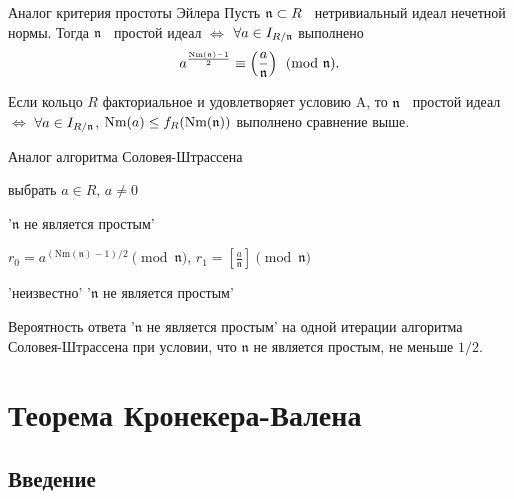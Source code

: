 \documentclass[8pt, xcolor=x11names]{beamer}
\begin{document}
\begin{frame}
    \begin{block}{Аналог критерия простоты Эйлера}
        Пусть $\mathfrak{n} \subset R$ \textendash\ нетривиальный идеал нечетной нормы.
        Тогда $\mathfrak{n}$ \textendash\ простой идеал $\Leftrightarrow$ $\forall a \in I_{R/\mathfrak{n}}$ выполнено
        \begin{equation*}\label{eq:euler}
            a^{\frac{\textrm{Nm}(\mathfrak{n}) - 1}{2}} \equiv \left(\frac{a}{\mathfrak{n}}\right) \pmod{\mathfrak{n}}.
        \end{equation*}
    
        Если кольцо $R$ факториальное и удовлетворяет условию A, то $\mathfrak{n}$ \textendash\ простой идеал $\Leftrightarrow$ $\forall a \in I_{R/\mathfrak{n}}$, $\textrm{Nm}(a) \le f_R(\textrm{Nm}(\mathfrak{n}))$ выполнено сравнение выше.
    \end{block}

    \begin{block}{Аналог алгоритма Соловея-Штрассена}
        \begin{algorithmic}[1]
            \State выбрать $a \in R$, $a \neq 0$

                \State\Return '$\mathfrak{n}$ не является простым'
            \EndIf

            \State $r_0 = a^{(\textrm{Nm}(\mathfrak{n}) - 1) / 2} \pmod{\mathfrak{n}}$, $r_1 = \left[\frac{a}{\mathfrak{n}}\right] \pmod{\mathfrak{n}}$
    		
    		    \State\Return 'неизвестно'
    		\Else
    		    \State\Return '$\mathfrak{n}$ не является простым'
    		\EndIf
        \end{algorithmic}

        Вероятность ответа '$\mathfrak{n}$ не является простым' на одной итерации алгоритма Соловея-Штрассена при условии, что $\mathfrak{n}$ не является простым, не меньше $1/2$.
    \end{block}
\end{frame}

\section{Теорема Кронекера-Валена}

\subsection{Введение}
\end{document}
